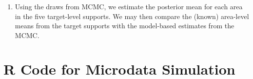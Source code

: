 \documentclass[12pt]{article}
\begin{document}
\begin{enumerate}
\item Using the draws from MCMC, we estimate the posterior mean for each area in the five target-level supports. We may then compare the (known) area-level means from the target supports with the model-based estimates from the MCMC.

\end{enumerate}



%

\clearpage

\appendix

\section{R Code for Microdata Simulation}
\label{sec:code}
\end{document}
